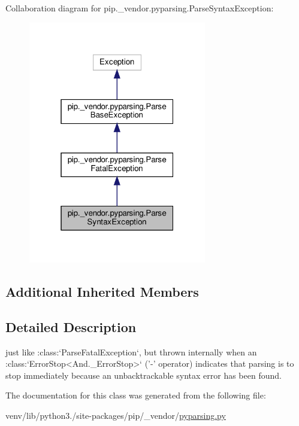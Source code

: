 Collaboration diagram for pip.\+\_\+vendor.\+pyparsing.\+Parse\+Syntax\+Exception\+:
\nopagebreak
\begin{figure}[H]
\begin{center}
\leavevmode
\includegraphics[width=220pt]{classpip_1_1__vendor_1_1pyparsing_1_1ParseSyntaxException__coll__graph}
\end{center}
\end{figure}
\subsection*{Additional Inherited Members}


\subsection{Detailed Description}
\begin{DoxyVerb}just like :class:`ParseFatalException`, but thrown internally
when an :class:`ErrorStop<And._ErrorStop>` ('-' operator) indicates
that parsing is to stop immediately because an unbacktrackable
syntax error has been found.
\end{DoxyVerb}
 

The documentation for this class was generated from the following file\+:\begin{DoxyCompactItemize}
\item 
venv/lib/python3./site-\/packages/pip/\+\_\+vendor/\hyperlink{pip_2__vendor_2pyparsing_8py}{pyparsing.\+py}\end{DoxyCompactItemize}
